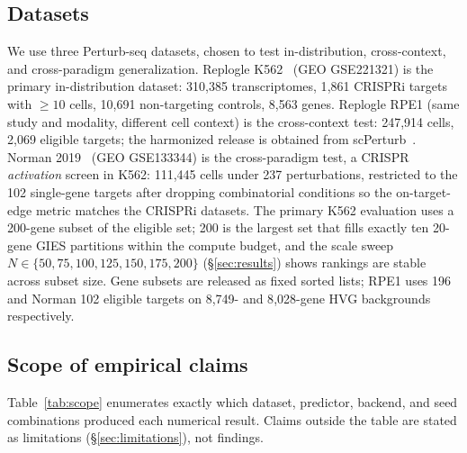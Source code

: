 \documentclass{article}
\theoremstyle{plain}
\theoremstyle{definition}
\theoremstyle{remark}
\begin{document}
\subsection{Datasets}
We use three Perturb-seq datasets, chosen to test in-distribution, cross-context, and cross-paradigm generalization. Replogle K562~\citep{replogle2022} (GEO GSE221321) is the primary in-distribution dataset: 310{,}385 transcriptomes, 1{,}861 CRISPRi targets with $\geq 10$ cells, 10{,}691 non-targeting controls, 8{,}563 genes. Replogle RPE1 (same study and modality, different cell context) is the cross-context test: 247{,}914 cells, 2{,}069 eligible targets; the harmonized release is obtained from scPerturb~\citep{peidli2024scperturb}. Norman 2019~\citep{norman2019} (GEO GSE133344) is the cross-paradigm test, a CRISPR \emph{activation} screen in K562: 111{,}445 cells under 237 perturbations, restricted to the 102 single-gene targets after dropping combinatorial conditions so the on-target-edge metric matches the CRISPRi datasets. The primary K562 evaluation uses a 200-gene subset of the eligible set; 200 is the largest set that fills exactly ten 20-gene GIES partitions within the compute budget, and the scale sweep $N\in\{50,75,100,125,150,175,200\}$ (\S\ref{sec:results}) shows rankings are stable across subset size. Gene subsets are released as fixed sorted lists; RPE1 uses 196 and Norman 102 eligible targets on 8{,}749- and 8{,}028-gene HVG backgrounds respectively.

\subsection{Scope of empirical claims}
\label{sec:scope}
Table~\ref{tab:scope} enumerates exactly which dataset, predictor, backend, and seed combinations produced each numerical result. Claims outside the table are stated as limitations (\S\ref{sec:limitations}), not findings.
\end{document}
